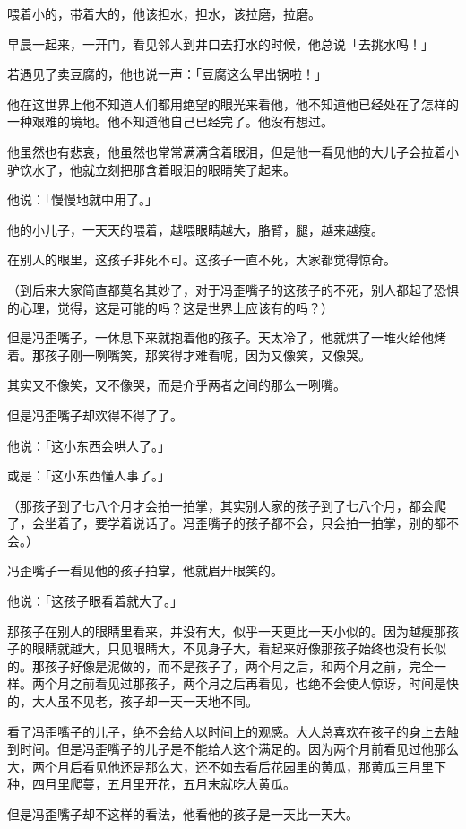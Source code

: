 \documentclass[UTF8]{ctexart}
\begin{document}
喂着小的，带着大的，他该担水，担水，该拉磨，拉磨。

早晨一起来，一开门，看见邻人到井口去打水的时候，他总说「去挑水吗！」

若遇见了卖豆腐的，他也说一声：「豆腐这么早出锅啦！」

他在这世界上他不知道人们都用绝望的眼光来看他，他不知道他已经处在了怎样的一种艰难的境地。他不知道他自己已经完了。他没有想过。

他虽然也有悲哀，他虽然也常常满满含着眼泪，但是他一看见他的大儿子会拉着小驴饮水了，他就立刻把那含着眼泪的眼睛笑了起来。

他说：「慢慢地就中用了。」

他的小儿子，一天天的喂着，越喂眼睛越大，胳臂，腿，越来越瘦。

在别人的眼里，这孩子非死不可。这孩子一直不死，大家都觉得惊奇。

（到后来大家简直都莫名其妙了，对于冯歪嘴子的这孩子的不死，别人都起了恐惧的心理，觉得，这是可能的吗？这是世界上应该有的吗？）

但是冯歪嘴子，一休息下来就抱着他的孩子。天太冷了，他就烘了一堆火给他烤着。那孩子刚一咧嘴笑，那笑得才难看呢，因为又像笑，又像哭。

其实又不像笑，又不像哭，而是介乎两者之间的那么一咧嘴。

但是冯歪嘴子却欢得不得了了。

他说：「这小东西会哄人了。」

或是：「这小东西懂人事了。」

（那孩子到了七八个月才会拍一拍掌，其实别人家的孩子到了七八个月，都会爬了，会坐着了，要学着说话了。冯歪嘴子的孩子都不会，只会拍一拍掌，别的都不会。）

冯歪嘴子一看见他的孩子拍掌，他就眉开眼笑的。

他说：「这孩子眼看着就大了。」

那孩子在别人的眼睛里看来，并没有大，似乎一天更比一天小似的。因为越瘦那孩子的眼睛就越大，只见眼睛大，不见身子大，看起来好像那孩子始终也没有长似的。那孩子好像是泥做的，而不是孩子了，两个月之后，和两个月之前，完全一样。两个月之前看见过那孩子，两个月之后再看见，也绝不会使人惊讶，时间是快的，大人虽不见老，孩子却一天一天地不同。

看了冯歪嘴子的儿子，绝不会给人以时间上的观感。大人总喜欢在孩子的身上去触到时间。但是冯歪嘴子的儿子是不能给人这个满足的。因为两个月前看见过他那么大，两个月后看见他还是那么大，还不如去看后花园里的黄瓜，那黄瓜三月里下种，四月里爬蔓，五月里开花，五月末就吃大黄瓜。

但是冯歪嘴子却不这样的看法，他看他的孩子是一天比一天大。
\end{document}
